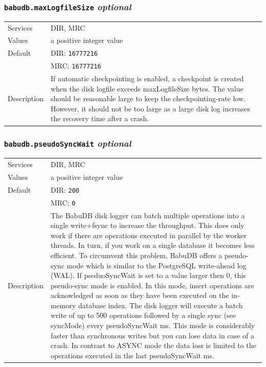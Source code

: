 \documentclass[a4paper,10pt]{book}
\begin{document}
\subsubsection{\texttt{babudb.maxLogfileSize} \textit{optional}}
\begin{tabular}{lp{10cm}}
 Services & DIR, MRC\\
 Values   & a positive integer value\\
 Default  & DIR: \texttt{16777216}\\
          & MRC: \texttt{16777216}\\
 Description & If automatic checkpointing is enabled, a checkpoint is created when the disk logfile exceeds maxLogfileSize bytes. The value should be reasonable large to keep the checkpointing-rate low. However, it should not be too large as a large disk log increases the recovery time after a crash.
\end{tabular}

\subsubsection{\texttt{babudb.pseudoSyncWait} \textit{optional}}
\begin{tabular}{lp{10cm}}
 Services & DIR, MRC\\
 Values   & a positive integer value\\
 Default  & DIR: \texttt{200}\\
          & MRC: \texttt{0}\\
 Description & The BabuDB disk logger can batch multiple operations into a single write+fsync to increase the throughput. This does only work if there are operations executed in parallel by the worker threads. In turn, if you work on a single database it becomes less efficient. To circumvent this problem, BabuDB offers a pseudo-sync mode which is similar to the PostgreSQL write-ahead log (WAL). If pseduoSyncWait is set to a value larger then 0, this pseudo-sync mode is enabled. In this mode, insert operations are acknowledged as soon as they have been executed on the in-memory database index. The disk logger will execute a batch write of up to 500 operations followed by a single sync (see syncMode) every pseudoSyncWait ms. This mode is considerably faster than synchronous writes but you can lose data in case of a crash. In contrast to ASYNC mode the data loss is limited to the operations executed in the last pseudoSyncWait ms.
\end{tabular}
\end{document}
